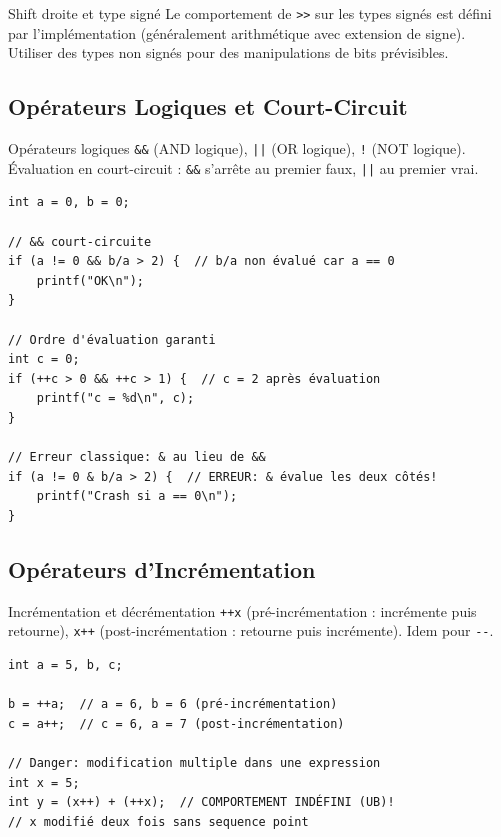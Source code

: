 \documentclass[10pt,a4paper]{article}
\begin{document}
\begin{warningbox}{Shift droite et type signé}
Le comportement de \texttt{>>} sur les types signés est défini par l'implémentation (généralement arithmétique avec extension de signe). Utiliser des types non signés pour des manipulations de bits prévisibles.
\end{warningbox}

\subsection{Opérateurs Logiques et Court-Circuit}

\begin{definitionbox}{Opérateurs logiques}
\texttt{\&\&} (AND logique), \texttt{||} (OR logique), \texttt{!} (NOT logique). Évaluation en court-circuit : \texttt{\&\&} s'arrête au premier faux, \texttt{||} au premier vrai.
\end{definitionbox}

\begin{lstlisting}[caption={Court-circuit et side-effects}]
int a = 0, b = 0;

// && court-circuite
if (a != 0 && b/a > 2) {  // b/a non évalué car a == 0
    printf("OK\n");
}

// Ordre d'évaluation garanti
int c = 0;
if (++c > 0 && ++c > 1) {  // c = 2 après évaluation
    printf("c = %d\n", c);
}

// Erreur classique: & au lieu de &&
if (a != 0 & b/a > 2) {  // ERREUR: & évalue les deux côtés!
    printf("Crash si a == 0\n");
}
\end{lstlisting}

\subsection{Opérateurs d'Incrémentation}

\begin{techbox}{Incrémentation et décrémentation}
\texttt{++x} (pré-incrémentation : incrémente puis retourne), \texttt{x++} (post-incrémentation : retourne puis incrémente). Idem pour \texttt{-{}-}.
\end{techbox}

\begin{lstlisting}[caption={Pré vs post incrémentation}]
int a = 5, b, c;

b = ++a;  // a = 6, b = 6 (pré-incrémentation)
c = a++;  // c = 6, a = 7 (post-incrémentation)

// Danger: modification multiple dans une expression
int x = 5;
int y = (x++) + (++x);  // COMPORTEMENT INDÉFINI (UB)!
// x modifié deux fois sans sequence point
\end{lstlisting}
\end{document}
